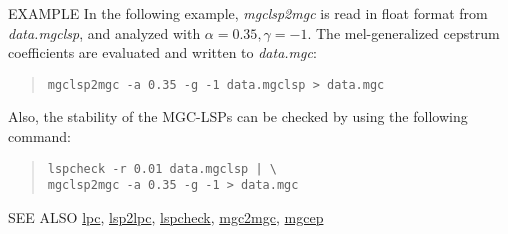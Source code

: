 \begin{qsection}{EXAMPLE}
 In the following example, {\em mgclsp2mgc} is read in float format from
 {\em data.mgclsp}, and analyzed with $\alpha = 0.35, \gamma = -1$. The
 mel-generalized cepstrum coefficients are evaluated and written
 to {\em data.mgc}:
\begin{quote}
\verb!mgclsp2mgc -a 0.35 -g -1 data.mgclsp > data.mgc!
\end{quote}
Also, the stability of the MGC-LSPs can be checked by using the following command:
\begin{quote}
\verb!lspcheck -r 0.01 data.mgclsp | \ ! \\
\verb!mgclsp2mgc -a 0.35 -g -1 > data.mgc!
\end{quote}
\end{qsection}

\begin{qsection}{SEE ALSO}
\hyperlink{lpc}{lpc},
\hyperlink{lsp2lpc}{lsp2lpc},
\hyperlink{lspcheck}{lspcheck},
\hyperlink{mgc2mgc}{mgc2mgc},
\hyperlink{mgcep}{mgcep}
\end{qsection}
